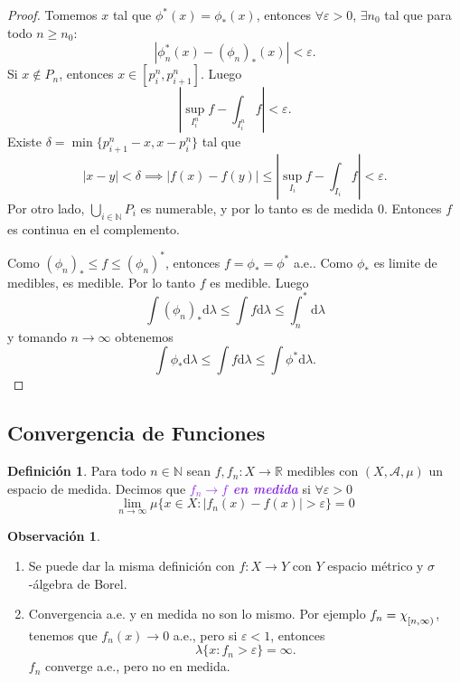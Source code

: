 \documentclass{article}
\theoremstyle{definition}
\newtheorem{definition}[theorem]{Definición}
\newtheorem*{obs}{Observación}
\theoremstyle{remark}
\numberwithin{equation}{section}
\newcommand{\N}{\mathbb{N}}
\newcommand{\R}{\mathbb{R}}
\newcommand{\Acal}{\mathcal{A}}
\renewcommand{\d}{\mathrm{d}}
\newcommand{\e}{\varepsilon}
\newcommand{\lam}{\lambda}
\newcommand{\oo}{\infty}
\newcommand{\abs}[1]{\left| #1 \right|}
\newcommand{\Chi}[1]{\chi_{\raisebox{-.5ex}{$\scriptstyle #1$}}}
\newcommand{\wea}[1]{\textcolor{BlueViolet}{\textbf{\emph{#1}}}}
\begin{document}
\begin{proof}
  Tomemos $x$ tal que $\phi^*(x) = \phi_*(x)$, entonces $\forall \e>0$, $\exists n_0$ tal que para todo $n \geq n_0$:
  \[ \abs{\phi_n^*(x) - (\phi_n)_*(x)} < \e. \]
  Si $x \notin P_n$, entonces $x \in [p_i^n,p_{i+1}^n]$. Luego 
  \[ \abs{\sup_{I_i^n} f - \int_{I_i^n} f} < \e. \]
  Existe $\delta = \min\{p_{i+1}^n - x, x - p_i^n\}$ tal que
  \[ \abs{x-y} < \delta \implies \abs{f(x)-f(y)} \leq \abs{\sup_{I_i} f - \int_{I_i} f} < \e. \]
  Por otro lado, $\bigcup_{i \in \N} P_i$ es numerable, y por lo tanto es de medida 0. Entonces $f$ es continua en el complemento.

  Como $(\phi_n)_* \leq f \leq (\phi_n)^*$, entonces $f = \phi_* = \phi^*$ a.e.. Como $\phi_*$ es limite de medibles, es medible. Por lo tanto $f$ es medible. Luego 
  \[ \int (\phi_n)_* \d\lam \leq \int f \d\lam \leq \int_n^* \d\lam \]
  y tomando $n\to\oo$ obtenemos 
  \[ \int \phi_* \d\lam \leq \int f\d\lam \leq \int \phi^* \d\lam. \]
\end{proof}

\newpage
\subsection{Convergencia de Funciones}

\begin{definition}
  Para todo $n \in \N$ sean $f,f_n \colon X \to \R$ medibles con $(X,\Acal,\mu)$ un espacio de medida.
  Decimos que \wea{$f_n \to f$ en medida} si $\forall \e>0$ 
  \[ \lim_{n\to\oo} \mu\{x \in X \colon \abs{f_n(x) - f(x)} > \e\} = 0 \]
\end{definition}

\begin{obs}
  \ 
  \begin{enumerate}[(1)]
    \item Se puede dar la misma definición con $f \colon X \to Y$ con $Y$ espacio métrico y \( \sigma \)-álgebra de Borel.
    \item Convergencia a.e. y en medida no son lo mismo. Por ejemplo $f_n = \Chi{[n,\oo)}$, tenemos que $f_n(x) \to 0$ a.e., pero si $\e<1$, entonces 
    \[ \lam\{x \colon f_n > \e\} = \oo. \]
    $f_n$ converge a.e., pero no en medida.
  \end{enumerate}
\end{obs}
\end{document}
